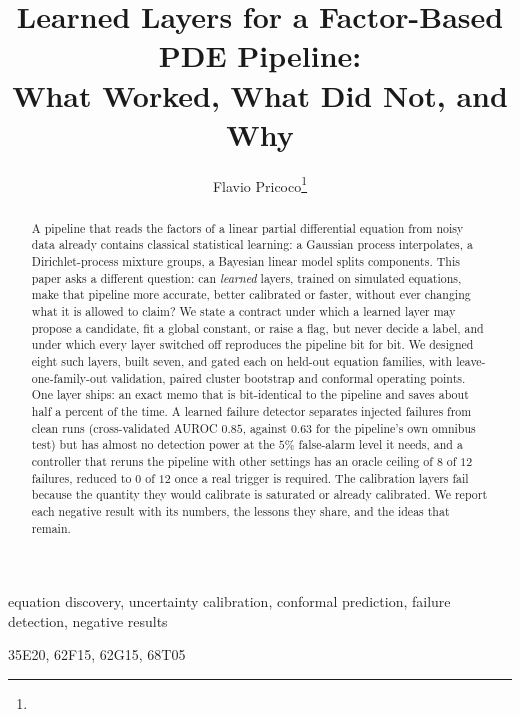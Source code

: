 \title{Learned Layers for a Factor-Based PDE Pipeline:\\What Worked, What Did Not, and Why}
\author{Flavio Pricoco\thanks{}}


\maketitle

\begin{abstract}
A pipeline that reads the factors of a linear partial differential equation from noisy data already contains classical
statistical learning: a Gaussian process interpolates, a Dirichlet-process mixture groups, a Bayesian linear model splits
components. This paper asks a different question: can \emph{learned} layers, trained on simulated equations, make that
pipeline more accurate, better calibrated or faster, without ever changing what it is allowed to claim? We state a
contract under which a learned layer may propose a candidate, fit a global constant, or raise a flag, but never decide a
label, and under which every layer switched off reproduces the pipeline bit for bit. We designed eight such layers, built seven, and
gated each on held-out equation families, with leave-one-family-out validation, paired cluster bootstrap and conformal
operating points. One layer ships: an exact memo that is bit-identical to the pipeline and saves about half a percent of the time.
A learned failure detector separates injected failures from clean runs (cross-validated AUROC $0.85$, against $0.63$ for the
pipeline's own omnibus test) but has almost no detection power at the $5\%$ false-alarm level it needs, and a
controller that reruns the pipeline with other settings has an oracle ceiling of $8$ of $12$ failures, reduced to $0$ of $12$
once a real trigger is required. The calibration layers fail because the quantity they would calibrate is saturated
or already calibrated. We report each negative result with its numbers, the lessons they share, and the ideas that remain.
\end{abstract}

\begin{keywords}
equation discovery, uncertainty calibration, conformal prediction, failure detection, negative results
\end{keywords}

\begin{MSCcodes}
35E20, 62F15, 62G15, 68T05
\end{MSCcodes}

